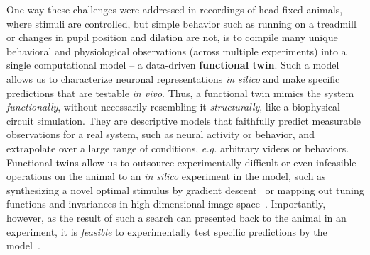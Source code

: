 \documentclass[B2,COG]{ercgrant}
\begin{document}
One way these challenges were addressed in recordings of head-fixed animals, where stimuli are controlled, but simple behavior such as running on a treadmill or changes in pupil position and dilation are not, is to compile many unique behavioral and physiological observations (across multiple experiments) into a single computational model -- a data-driven \textbf{functional twin}.
Such a model allows us to characterize neuronal representations \textit{in silico} and make specific predictions that are testable \textit{in vivo}. 
Thus, a functional twin mimics the system \textit{functionally}, without necessarily resembling it \textit{structurally}, like a biophysical circuit simulation.  
They are descriptive models that faithfully predict measurable observations for a real system, such as neural activity or behavior, and extrapolate over a large range of conditions, \textit{e.g.} arbitrary videos or behaviors. 
Functional twins allow us to outsource experimentally difficult or even infeasible operations on the animal to an \textit{in silico} experiment in the model, such as synthesizing a novel optimal stimulus by gradient descent~\parencite{Walker2019-yw} or mapping out tuning functions and invariances in high dimensional image space~\parencite{Baroni2022-fi}. 
Importantly, however, as the result of such a search can presented back to the animal in an experiment, it is \textit{feasible} to experimentally test specific predictions by the model~\parencite{Walker2019-yw,Bashivan2019-ry}.
\end{document}
